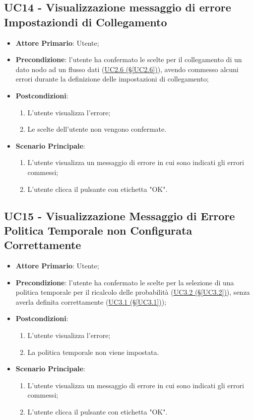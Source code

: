 \newpage

\subsection{UC14 - Visualizzazione messaggio di errore Impostaziondi di Collegamento}\label{UC14}
\begin{itemize}
\item \textbf{Attore Primario}: Utente;
\item \textbf{Precondizione}: l'utente ha confermato le scelte per il collegamento di un dato nodo ad un flusso dati (\hyperref[UC2.6]{UC2.6 (§\ref*{UC2.6})}), avendo commesso alcuni errori durante la definizione delle impostazioni di collegamento;
\item \textbf{Postcondizioni}:
	\begin{enumerate}
	\item L'utente visualizza l'errore;
	\item Le scelte dell'utente non vengono confermate.
	\end{enumerate}
\item \textbf{Scenario Principale}:
	\begin{enumerate}
	\item L'utente visualizza un messaggio di errore in cui sono indicati gli errori commessi;
	\item L'utente clicca il pulsante con etichetta "OK".
	\end{enumerate}
\end{itemize}

\pagebreak

\subsection{UC15 - Visualizzazione Messaggio di Errore Politica Temporale non Configurata Correttamente}\label{UC15}
\begin{itemize}
	\item \textbf{Attore Primario}: Utente;
	\item \textbf{Precondizione}: l'utente ha confermato le scelte per la selezione di una politica temporale per il ricalcolo delle probabilità (\hyperref[UC3.2]{UC3.2 (§\ref*{UC3.2})}), senza averla definita correttamente (\hyperref[UC3.1]{UC3.1 (§\ref*{UC3.1})});
	\item \textbf{Postcondizioni}:
	\begin{enumerate}
		\item L'utente visualizza l'errore;
		\item La politica temporale non viene impostata.
	\end{enumerate}
	\item \textbf{Scenario Principale}:
	\begin{enumerate}
		\item L'utente visualizza un messaggio di errore in cui sono indicati gli errori commessi;
		\item L'utente clicca il pulsante con etichetta "OK".
	\end{enumerate}
\end{itemize}

